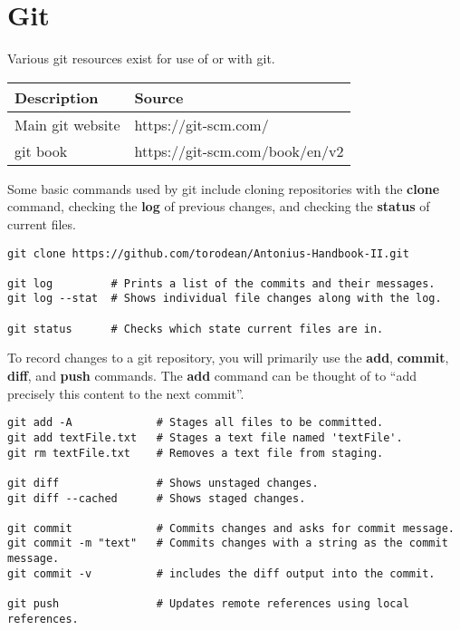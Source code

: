\chapter{Git}
\thispagestyle{fancy}
\lstset{language=Bash, style=bash}

\begin{fancybox}{}	
	Various git resources exist for use of or with git.
	\begin{center}
		\begin{tabular}{l|l}
			Description & Source \\
			\hline
			Main git website & https://git-scm.com/ \\
			git book & https://git-scm.com/book/en/v2
		\end{tabular}
	\end{center}
\end{fancybox}

Some basic commands used by git include cloning repositories with the \textbf{clone} command, checking the \textbf{log} of previous changes, and checking the \textbf{status} of current files.
\begin{lstlisting}
git clone https://github.com/torodean/Antonius-Handbook-II.git

git log         # Prints a list of the commits and their messages.
git log --stat  # Shows individual file changes along with the log.

git status      # Checks which state current files are in.
\end{lstlisting}

To record changes to a git repository, you will primarily use the \textbf{add}, \textbf{commit}, \textbf{diff}, and \textbf{push} commands. The \textbf{add} command can be thought of to ``add precisely this content to the next commit''. 
\begin{lstlisting}
git add -A             # Stages all files to be committed.
git add textFile.txt   # Stages a text file named 'textFile'.
git rm textFile.txt    # Removes a text file from staging.

git diff               # Shows unstaged changes.
git diff --cached      # Shows staged changes.

git commit             # Commits changes and asks for commit message.
git commit -m "text"   # Commits changes with a string as the commit message.
git commit -v          # includes the diff output into the commit.

git push               # Updates remote references using local references.
\end{lstlisting}


